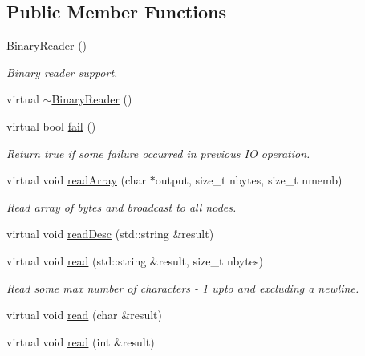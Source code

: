\subsection*{Public Member Functions}
\begin{DoxyCompactItemize}
\item 
\mbox{\hyperlink{classADATIO_1_1BinaryReader_a19220cacd1c2fce407b2606d202ff1c5}{Binary\+Reader}} ()
\begin{DoxyCompactList}\small\item\em Binary reader support. \end{DoxyCompactList}\item 
virtual \mbox{\hyperlink{classADATIO_1_1BinaryReader_aeead13e32ec4228418b5b34f9de88c9d}{$\sim$\+Binary\+Reader}} ()
\item 
virtual bool \mbox{\hyperlink{classADATIO_1_1BinaryReader_a74e6bd6e0add2d0af3266b2c0578ae5f}{fail}} ()
\begin{DoxyCompactList}\small\item\em Return true if some failure occurred in previous IO operation. \end{DoxyCompactList}\item 
virtual void \mbox{\hyperlink{classADATIO_1_1BinaryReader_a9c68e2d4ecd86773a48a3a38f0c90677}{read\+Array}} (char $\ast$output, size\+\_\+t nbytes, size\+\_\+t nmemb)
\begin{DoxyCompactList}\small\item\em Read array of bytes and broadcast to all nodes. \end{DoxyCompactList}\item 
virtual void \mbox{\hyperlink{classADATIO_1_1BinaryReader_a70de2f31f59d9846f4ee688c3590bf31}{read\+Desc}} (std\+::string \&result)
\item 
virtual void \mbox{\hyperlink{classADATIO_1_1BinaryReader_a4d79cabea18fccc818eaf2c45ed21b1f}{read}} (std\+::string \&result, size\+\_\+t nbytes)
\begin{DoxyCompactList}\small\item\em Read some max number of characters -\/ 1 upto and excluding a newline. \end{DoxyCompactList}\item 
virtual void \mbox{\hyperlink{classADATIO_1_1BinaryReader_ae570afc4063058ada2653bbe7b7d7998}{read}} (char \&result)
\item 
virtual void \mbox{\hyperlink{classADATIO_1_1BinaryReader_a3e4c97af4775a75b10ce2aba55776614}{read}} (int \&result)
\item 

\end{DoxyCompactItemize}
